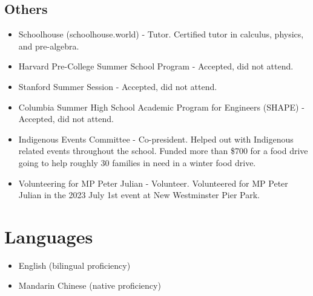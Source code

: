 \documentclass{article}
\begin{document}
\subsection*{Others}
\begin{itemize}
    \item Schoolhouse (schoolhouse.world) - Tutor. Certified tutor in calculus, physics, and pre-algebra.
    \item Harvard Pre-College Summer School Program - Accepted, did not attend.
    \item Stanford Summer Session - Accepted, did not attend.
    \item Columbia Summer High School Academic Program for Engineers (SHAPE) - Accepted, did not attend.
    \item Indigenous Events Committee - Co-president. Helped out with Indigenous related events throughout the school. Funded more than \$700 for a food drive going to help roughly 30 families in need in a winter food drive.
    \item Volunteering for MP Peter Julian - Volunteer. Volunteered for MP Peter Julian in the 2023 July 1st event at New Westminster Pier Park.
\end{itemize}

\section*{Languages}

\begin{itemize}
    \item English (bilingual proficiency)
    \item Mandarin Chinese (native proficiency)
\end{itemize}
\end{document}
